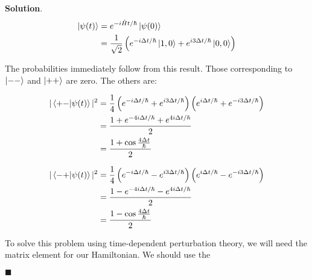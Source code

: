 \documentclass[12pt]{article}
\theoremstyle{definition}
\newenvironment{s}{%
        \begin{trivlist} \item \textbf{Solution}. }{%
            \hspace*{\fill} $\blacksquare$\end{trivlist}}%
\begin{document}
{\begin{s}
\begin{align*}
\ket{\psi(t)} &= e^{-i\hat{H}t/\hbar}\ket{\psi(0)}\\
&= \frac{1}{\sqrt{2}}\left(e^{-i\Delta t/\hbar}\ket{1,0} + e^{i3\Delta t/\hbar}\ket{0,0}\right)
\end{align*}

The probabilities immediately follow from this result. Those corresponding to $\ket{--}$ and $\ket{++}$ are zero. The others are:

\begin{align*}
|\bra{+-}\ket{\psi(t)}|^{2} &= \frac{1}{4}\left(e^{-i\Delta t/\hbar} + e^{i3\Delta t/\hbar}\right)\left(e^{i\Delta t/\hbar} + e^{-i3\Delta t/\hbar}\right)\\
&= \frac{1+ e^{-4i\Delta t / \hbar} + e^{4i\Delta t / \hbar}}{2}\\
&= \frac{1+\cos\frac{4\Delta t}{\hbar}}{2}
\end{align*}

\begin{align*}
|\bra{-+}\ket{\psi(t)}|^{2} &= \frac{1}{4}\left(e^{-i\Delta t/\hbar} - e^{i3\Delta t/\hbar}\right)\left(e^{i\Delta t/\hbar} - e^{-i3\Delta t/\hbar}\right)\\
&= \frac{1 - e^{-4i\Delta t / \hbar} - e^{4i\Delta t / \hbar}}{2}\\
&= \frac{1-\cos\frac{4\Delta t}{\hbar}}{2}
\end{align*}


To solve this problem using time-dependent perturbation theory, we will need the matrix element for our Hamiltonian. We should use the 



\end{s}
\end{document}
